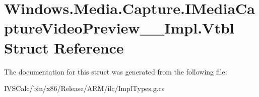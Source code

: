 \hypertarget{struct_windows_1_1_media_1_1_capture_1_1_i_media_capture_video_preview_____impl_1_1_vtbl}{}\section{Windows.\+Media.\+Capture.\+I\+Media\+Capture\+Video\+Preview\+\_\+\+\_\+\+Impl.\+Vtbl Struct Reference}
\label{struct_windows_1_1_media_1_1_capture_1_1_i_media_capture_video_preview_____impl_1_1_vtbl}


The documentation for this struct was generated from the following file\+:\begin{DoxyCompactItemize}
\item 
I\+V\+S\+Calc/bin/x86/\+Release/\+A\+R\+M/ilc/Impl\+Types.\+g.\+cs\end{DoxyCompactItemize}
